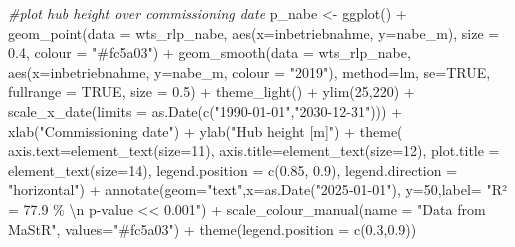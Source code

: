 \documentclass[a4paper,11pt]{article}
\newenvironment{Shaded}{\begin{snugshade}}{\end{snugshade}}
\newcommand{\AttributeTok}[1]{\textcolor[rgb]{0.77,0.63,0.00}{#1}}
\newcommand{\CommentTok}[1]{\textcolor[rgb]{0.56,0.35,0.01}{\textit{#1}}}
\newcommand{\ConstantTok}[1]{\textcolor[rgb]{0.00,0.00,0.00}{#1}}
\newcommand{\DecValTok}[1]{\textcolor[rgb]{0.00,0.00,0.81}{#1}}
\newcommand{\FloatTok}[1]{\textcolor[rgb]{0.00,0.00,0.81}{#1}}
\newcommand{\FunctionTok}[1]{\textcolor[rgb]{0.00,0.00,0.00}{#1}}
\newcommand{\NormalTok}[1]{#1}
\newcommand{\OtherTok}[1]{\textcolor[rgb]{0.56,0.35,0.01}{#1}}
\newcommand{\SpecialCharTok}[1]{\textcolor[rgb]{0.00,0.00,0.00}{#1}}
\newcommand{\StringTok}[1]{\textcolor[rgb]{0.31,0.60,0.02}{#1}}
\begin{document}
\begin{Shaded}
\begin{Highlighting}[]
\CommentTok{\#plot hub height over commissioning date}
\NormalTok{p\_nabe }\OtherTok{\textless{}{-}} \FunctionTok{ggplot}\NormalTok{() }\SpecialCharTok{+}
  \FunctionTok{geom\_point}\NormalTok{(}\AttributeTok{data =}\NormalTok{ wts\_rlp\_nabe, }\FunctionTok{aes}\NormalTok{(}\AttributeTok{x=}\NormalTok{inbetriebnahme, }\AttributeTok{y=}\NormalTok{nabe\_m), }
             \AttributeTok{size =} \FloatTok{0.4}\NormalTok{, }\AttributeTok{colour =} \StringTok{"\#fc5a03"}\NormalTok{) }\SpecialCharTok{+}
  \FunctionTok{geom\_smooth}\NormalTok{(}\AttributeTok{data =}\NormalTok{ wts\_rlp\_nabe, }
              \FunctionTok{aes}\NormalTok{(}\AttributeTok{x=}\NormalTok{inbetriebnahme, }\AttributeTok{y=}\NormalTok{nabe\_m, }\AttributeTok{colour =} \StringTok{"2019"}\NormalTok{), }
              \AttributeTok{method=}\NormalTok{lm, }\AttributeTok{se=}\ConstantTok{TRUE}\NormalTok{, }\AttributeTok{fullrange =} \ConstantTok{TRUE}\NormalTok{, }\AttributeTok{size =} \FloatTok{0.5}\NormalTok{)  }\SpecialCharTok{+}
  \FunctionTok{theme\_light}\NormalTok{() }\SpecialCharTok{+}
  \FunctionTok{ylim}\NormalTok{(}\DecValTok{25}\NormalTok{,}\DecValTok{220}\NormalTok{) }\SpecialCharTok{+}
  \FunctionTok{scale\_x\_date}\NormalTok{(}\AttributeTok{limits =} \FunctionTok{as.Date}\NormalTok{(}\FunctionTok{c}\NormalTok{(}\StringTok{"1990{-}01{-}01"}\NormalTok{,}\StringTok{"2030{-}12{-}31"}\NormalTok{))) }\SpecialCharTok{+}
  \FunctionTok{xlab}\NormalTok{(}\StringTok{"Commissioning date"}\NormalTok{) }\SpecialCharTok{+}
  \FunctionTok{ylab}\NormalTok{(}\StringTok{"Hub height [m]"}\NormalTok{) }\SpecialCharTok{+}
  \FunctionTok{theme}\NormalTok{( }\AttributeTok{axis.text=}\FunctionTok{element\_text}\NormalTok{(}\AttributeTok{size=}\DecValTok{11}\NormalTok{),}
         \AttributeTok{axis.title=}\FunctionTok{element\_text}\NormalTok{(}\AttributeTok{size=}\DecValTok{12}\NormalTok{),}
         \AttributeTok{plot.title =} \FunctionTok{element\_text}\NormalTok{(}\AttributeTok{size=}\DecValTok{14}\NormalTok{),}
         \AttributeTok{legend.position =} \FunctionTok{c}\NormalTok{(}\FloatTok{0.85}\NormalTok{, }\FloatTok{0.9}\NormalTok{),}
         \AttributeTok{legend.direction =} \StringTok{"horizontal"}\NormalTok{) }\SpecialCharTok{+}
  \FunctionTok{annotate}\NormalTok{(}\AttributeTok{geom=}\StringTok{"text"}\NormalTok{,}\AttributeTok{x=}\FunctionTok{as.Date}\NormalTok{(}\StringTok{"2025{-}01{-}01"}\NormalTok{),}
           \AttributeTok{y=}\DecValTok{50}\NormalTok{,}\AttributeTok{label=} \StringTok{"R² = 77.9 \% }\SpecialCharTok{\textbackslash{}n}\StringTok{ p{-}value \textless{}\textless{} 0.001"}\NormalTok{) }\SpecialCharTok{+}
  \FunctionTok{scale\_colour\_manual}\NormalTok{(}\AttributeTok{name =} \StringTok{"Data from MaStR"}\NormalTok{, }
                      \AttributeTok{values=}\StringTok{"\#fc5a03"}\NormalTok{) }\SpecialCharTok{+}
  \FunctionTok{theme}\NormalTok{(}\AttributeTok{legend.position =} \FunctionTok{c}\NormalTok{(}\FloatTok{0.3}\NormalTok{,}\FloatTok{0.9}\NormalTok{))}


\end{Highlighting}
\end{Shaded}
\end{document}
